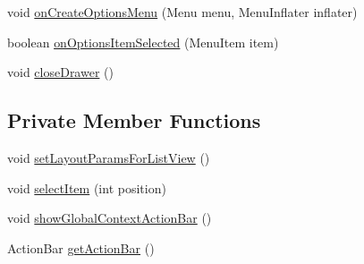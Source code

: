 \begin{DoxyCompactItemize}
\item 
void \hyperlink{classorg_1_1buildmlearn_1_1toolkit_1_1fragment_1_1NavigationDrawerFragment_a23412cd6598c10cee64ff60848cc6771}{on\+Create\+Options\+Menu} (Menu menu, Menu\+Inflater inflater)
\item 
boolean \hyperlink{classorg_1_1buildmlearn_1_1toolkit_1_1fragment_1_1NavigationDrawerFragment_a68eb844e52918f108a9145c9fd9e1bee}{on\+Options\+Item\+Selected} (Menu\+Item item)
\item 
void \hyperlink{classorg_1_1buildmlearn_1_1toolkit_1_1fragment_1_1NavigationDrawerFragment_ae30430603d53f0fc8611d9a88be61774}{close\+Drawer} ()
\end{DoxyCompactItemize}
\subsection*{Private Member Functions}
\begin{DoxyCompactItemize}
\item 
void \hyperlink{classorg_1_1buildmlearn_1_1toolkit_1_1fragment_1_1NavigationDrawerFragment_aa4565d86ee6ec6ad23dfbc2a140f7c4c}{set\+Layout\+Params\+For\+List\+View} ()
\item 
void \hyperlink{classorg_1_1buildmlearn_1_1toolkit_1_1fragment_1_1NavigationDrawerFragment_a08d294dadf853b78a33836403a6a2d42}{select\+Item} (int position)
\item 
void \hyperlink{classorg_1_1buildmlearn_1_1toolkit_1_1fragment_1_1NavigationDrawerFragment_a082efc992fd2f9af81579c038f1c1bd0}{show\+Global\+Context\+Action\+Bar} ()
\item 
Action\+Bar \hyperlink{classorg_1_1buildmlearn_1_1toolkit_1_1fragment_1_1NavigationDrawerFragment_a84ffac4d244a528b278d27732387b551}{get\+Action\+Bar} ()
\end{DoxyCompactItemize}
